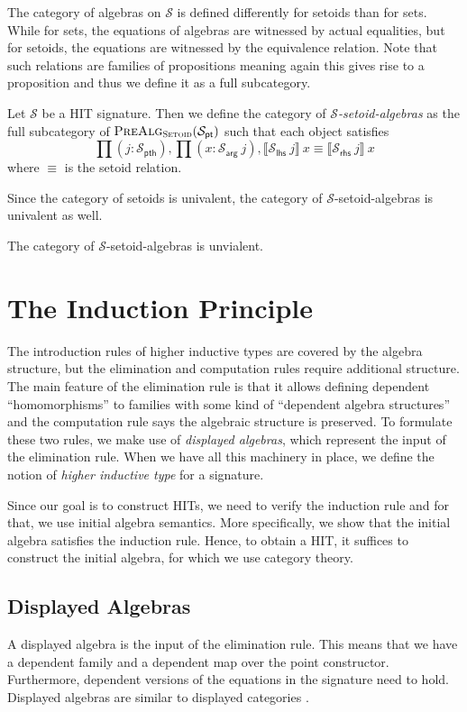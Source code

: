 \documentclass[9pt]{entcs}
\newcommand{\category}[1]{\textsc{#1}}
\newcommand{\deprod}[3]{\prod(#1 : #2), #3} %
\newcommand{\0}{\textbf{0}} %
\newcommand{\1}{\textbf{1}} %
\newcommand{\setoids}{\category{Setoid}} %
\newcommand{\pt}[0]{\textsf{pt}}
\newcommand{\pthI}[0]{\textsf{pth}}
\newcommand{\pthA}[0]{\textsf{arg}}
\newcommand{\pthlh}[0]{\textsf{lhs}}
\newcommand{\pthrh}[0]{\textsf{rhs}}
\newcommand{\pointc}[1]{#1_{\pt}} %
\newcommand{\pathI}[1]{#1_{\pthI}} %
\newcommand{\pathA}[1]{#1_{\pthA}} %
\newcommand{\pathlh}[1]{#1_{\pthlh}} %
\newcommand{\pathrh}[1]{#1_{\pthrh}} %
\newcommand{\sig}{\mathcal{S}} %
\newcommand{\semE}[1]{\llbracket #1 \rrbracket} %
\newcommand{\prealgst}[1]{\category{PreAlg}_{\setoids}(#1)} %
\begin{document}
The category of algebras on $\sig$ is defined differently for setoids than for sets.
While for sets, the equations of algebras are witnessed by actual equalities, but for setoids, the equations are witnessed by the equivalence relation.
Note that such relations are families of propositions meaning again this gives rise to a proposition and thus we define it as a full subcategory.

\begin{definition}
Let $\sig$ be a HIT signature.
Then we define the category of \emph{$\sig$-setoid-algebras} as the full subcategory of $\prealgst{\pointc{\sig}}$ such that each object satisfies
\[
\deprod{j}{\pathI{\sig}}{\deprod{x}{\pathA{\sig} \> j}{\semE{\pathlh{\sig} \> j} \> x \equiv \semE{\pathrh{\sig} \> j} \> x}}
\]
where $\equiv$  is the setoid relation.
\end{definition}

Since the category of setoids is univalent, the category of $\sig$-setoid-algebras is univalent as well.

\begin{proposition}
The category of $\sig$-setoid-algebras is unvialent.
\end{proposition}

\section{The Induction Principle}
\label{sec:induction}
The introduction rules of higher inductive types are covered by the algebra structure, but the elimination and computation rules require additional structure.
The main feature of the elimination rule is that it allows defining dependent ``homomorphisms'' to families with some kind of ``dependent algebra structures'' and the computation rule says the algebraic structure is preserved.
To formulate these two rules, we make use of \emph{displayed algebras}, which represent the input of the elimination rule.
When we have all this machinery in place, we define the notion of \emph{higher inductive type} for a signature.

Since our goal is to construct HITs, we need to verify the induction rule and for that, we use initial algebra semantics.
More specifically, we show that the initial algebra satisfies the induction rule.
Hence, to obtain a HIT, it suffices to construct the initial algebra, for which we use category theory.

\subsection{Displayed Algebras}
\label{ref:induction}
A displayed algebra is the input of the elimination rule.
This means that we have a dependent family and a dependent map over the point constructor.
Furthermore, dependent versions of the equations in the signature need to hold.
Displayed algebras are similar to displayed categories \cite{AhrensL19}.
\end{document}
